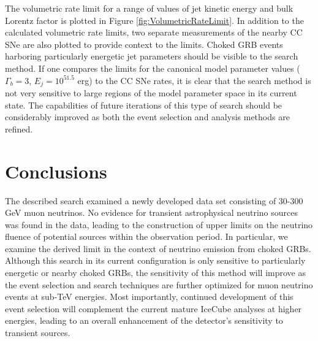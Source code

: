 \documentclass[manuscript]{aastex}
\begin{document}
The volumetric rate limit for a range of values of jet kinetic energy and bulk Lorentz factor is plotted in Figure \ref{fig:VolumetricRateLimit}. In addition to the calculated volumetric rate limits, two separate measurements of the nearby CC SNe are also plotted to provide context to the limits. Choked GRB events harboring particularly energetic jet parameters should be visible to the search method. If one compares the limits for the canonical model parameter values ($\Gamma_b = 3$, $E_j = 10^{51.5}$ erg) to the CC SNe rates, it is clear that the search method is not very sensitive to large regions of the model parameter space in its current state. The capabilities of future iterations of this type of search should be considerably improved as both the event selection and analysis methods are refined.

\section{Conclusions}
The described search examined a newly developed data set consisting of 30-300 GeV muon neutrinos. No evidence for transient astrophysical neutrino sources was found in the data, leading to the construction of upper limits on the neutrino fluence of potential sources within the observation period. In particular, we examine the derived limit in the context of neutrino emission from choked GRBs. Although this search in its current configuration is only sensitive to particularly energetic or nearby choked GRBs, the sensitivity of this method will improve as the event selection and search techniques are further optimized for muon neutrino events at sub-TeV energies. Most importantly, continued development of this event selection will complement the current mature IceCube analyses at higher energies, leading to an overall enhancement of the detector's sensitivity to transient sources.
\end{document}
